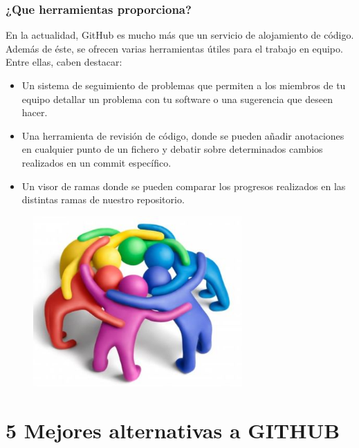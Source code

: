 \documentclass[12pt,letterpaper]{article}
\begin{document}
\section{¿Que herramientas proporciona?}
En la actualidad, GitHub es mucho más que un servicio de alojamiento de código. Además de éste, se ofrecen varias herramientas útiles para el trabajo en equipo. Entre ellas, caben destacar:

\begin{itemize}
    \item Un sistema de seguimiento de problemas que permiten a los miembros de tu equipo detallar un problema con tu software o una sugerencia que deseen hacer.
    \item Una herramienta de revisión de código, donde se pueden añadir anotaciones en cualquier punto de un fichero y debatir sobre determinados cambios realizados en un commit específico.
    \item Un visor de ramas donde se pueden comparar los progresos realizados en las distintas ramas de nuestro repositorio.
\end{itemize}

\vspace*{-0.025in}
\begin{figure}[htb]
\begin{center}
\includegraphics[width=8cm]{./Imagenes/trabajo-en-equipo}
\end{center}
\end{figure}

\part{5 Mejores alternativas a GITHUB}
\end{document}
